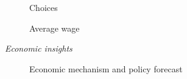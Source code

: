 \begin{frame}
  \begin{figure}
  \caption{Choices}
  \end{figure}
\end{frame}

\begin{frame}
  \begin{figure}
  \caption{Average wage}
  \end{figure}
\end{frame}
\begin{frame}\begin{center}
		\LARGE\textit{Economic insights}
\end{center}\end{frame}
\begin{frame}
  \begin{figure}[h!]\centering
  \caption{Economic mechanism and policy forecast}\label{Economic mechanism and policy forecast}
  \hspace{0.3cm}
  \end{figure}
\end{frame}
